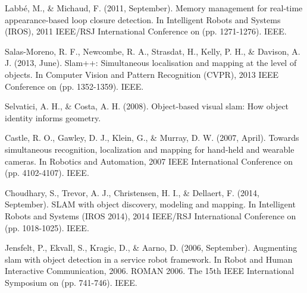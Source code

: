 \documentclass[twoside]{article}
\begin{document}
\begin{multicols}{2}
\begin{thebibliography}{9}




\newblock Labbé, M., \& Michaud, F. (2011, September). Memory management for real-time appearance-based loop closure detection. In Intelligent Robots and Systems (IROS), 2011 IEEE/RSJ International Conference on (pp. 1271-1276). IEEE.


\newblock Salas-Moreno, R. F., Newcombe, R. A., Strasdat, H., Kelly, P. H., \& Davison, A. J. (2013, June). Slam++: Simultaneous localisation and mapping at the level of objects. In Computer Vision and Pattern Recognition (CVPR), 2013 IEEE Conference on (pp. 1352-1359). IEEE.

\newblock Selvatici, A. H., \& Costa, A. H. (2008). Object-based visual slam: How object identity informs geometry.

\newblock Castle, R. O., Gawley, D. J., Klein, G., \& Murray, D. W. (2007, April). Towards simultaneous recognition, localization and mapping for hand-held and wearable cameras. In Robotics and Automation, 2007 IEEE International Conference on (pp. 4102-4107). IEEE.


\newblock Choudhary, S., Trevor, A. J., Christensen, H. I., \& Dellaert, F. (2014, September). SLAM with object discovery, modeling and mapping. In Intelligent Robots and Systems (IROS 2014), 2014 IEEE/RSJ International Conference on (pp. 1018-1025). IEEE.

\newblock Jensfelt, P., Ekvall, S., Kragic, D., \& Aarno, D. (2006, September). Augmenting slam with object detection in a service robot framework. In Robot and Human Interactive Communication, 2006. ROMAN 2006. The 15th IEEE International Symposium on (pp. 741-746). IEEE.


\end{thebibliography}
\end{multicols}
\end{document}
